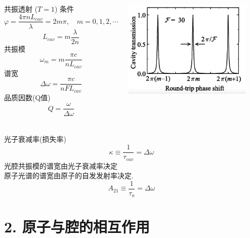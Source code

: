   \begin{frame} 
  \frametitle{}
  \begin{columns}[T,onlytextwidth]
       共振透射 ($T=1$) 条件
       \[ \varphi =\frac{4\pi n L_{cav}}{\lambda} = 2 m \pi, \quad m=0, 1, 2, \cdots  \]
       \[L_{cav} = m \frac{\lambda}{2n}\]
       共振模
       \[ \omega_m = m \frac{\pi c }{n L_{cav}}\]
       谱宽
       \[ \Delta \omega = \frac{\pi c }{n F L_{cav}}\]
       品质因数(Q值)
       \[ Q= \frac{\omega}{\Delta \omega }\]
       \begin{center}
            \includegraphics[width=0.9\textwidth]{figs/2022-05-23-00-15-53.png}
       \end{center}
    \end{columns}
  \end{frame}

  \begin{frame} 
  \frametitle{}
    光子衰减率(损失率)
  \[ \boxed{\kappa \equiv  \frac{1}{\tau_{cav}} = \Delta \omega } \]
       光腔共振模的谱宽由光子衰减率决定 \\ {\vspace*{1.3em}}
       原子光谱的谱宽由原子的自发发射率决定.
       \[ \boxed{A_{21} \equiv  \frac{1}{\tau_{a}} = \Delta \omega } \]
  \end{frame}

  \section{2. 原子与腔的相互作用}

\begin{frame} 
\frametitle{}
     
\end{frame}